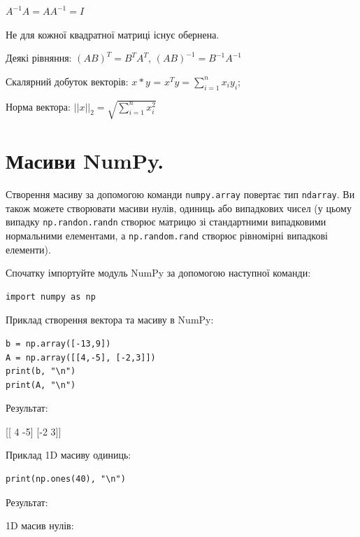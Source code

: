 $A^{-1}A=AA^{-1}=I$

Не для кожної квадратної матриці існує обернена.

Деякі рівняння: $(AB)^{T}=B^{T}A^{T}$, $(AB)^{-1}=B^{-1}A^{-1}$

Скалярний добуток векторів: $x*y$ = $x^{T}y = \sum_{i=1}^{n}x_{i}y_{i}$;

Норма вектора: $||x||_{2} = \sqrt{\sum_{i=1}^{n}x_{i}^{2}}$



\section{Масиви NumPy.}

Створення масиву за допомогою команди \verb|numpy.array| повертає тип \verb|ndarray|. Ви також можете створювати масиви нулів, одиниць або випадкових чисел (у цьому випадку \verb|np.randon.randn| створює матрицю зі стандартними випадковими нормальними елементами, а \verb|np.random.rand| створює рівномірні випадкові елементи).

Спочатку імпортуйте модуль NumPy за допомогою наступної команди:

\begin{lstlisting}
import numpy as np
\end{lstlisting}

Приклад створення вектора та масиву в NumPy:

\begin{lstlisting}
b = np.array([-13,9])           
A = np.array([[4,-5], [-2,3]])   
print(b, "\n")
print(A, "\n")
\end{lstlisting}

Результат:

\begin{console}
[-13   9] 

[[ 4 -5]
 [-2  3]] 
\end{console}

Приклад 1D масиву одиниць:

\begin{lstlisting}
print(np.ones(40), "\n")
\end{lstlisting}

Результат:

\begin{console}
[1. 1. 1. 1. 1. 1. 1. 1. 1. 1. 1. 1. 1. 1. 1. 1. 1. 1. 1. 1. 1. 1. 1. 1.
 1. 1. 1. 1. 1. 1. 1. 1. 1. 1. 1. 1. 1. 1. 1. 1.] 
\end{console}


1D масив нулів:


